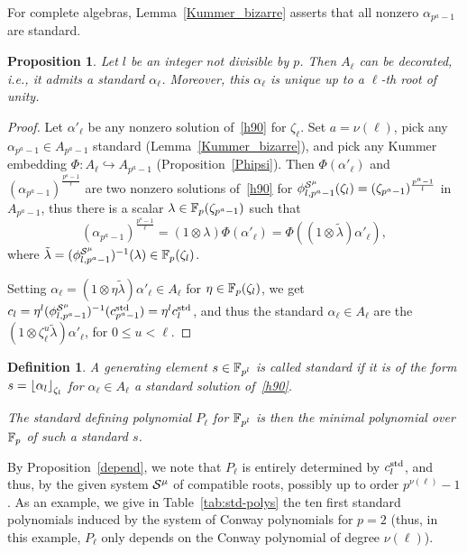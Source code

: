 \documentclass{sig-alternate}
\newtheorem{proposition}[theorem]{Proposition}
\newtheorem{definition}[theorem]{Definition}
\begin{document}
For complete algebras, Lemma~\ref{Kummer_bizarre} asserts that all nonzero $\alpha_{p^a-1}$ are standard.
\begin{proposition}
\label{standardexiste}
Let $l$ be an integer not divisible by $p$.
Then $A_\ell$ can be decorated, i.e., it admits a standard $\alpha_\ell$.
Moreover, this $\alpha_\ell$ is unique up to a $\ell$-th root of unity.
\end{proposition}
\begin{proof}
Let $\alpha'_\ell$ be any nonzero solution of~\eqref{h90} for $\zeta_\ell$.
Set $a=\nu(\ell)$, pick any $\alpha_{p^a-1}\in A_{p^a-1}$ standard (Lemma~\ref{Kummer_bizarre}),
and pick any Kummer embedding $\Phi:A_\ell\hookrightarrow A_{p^a-1}$ (Proposition~\ref{Phipsi}).
Then $\Phi(\alpha'_\ell)$ and $(\alpha_{p^a-1})^{\frac{p^a-1}{\ell}}$ are two nonzero solutions of~\eqref{h90}
for ${\phi^{\mathcal{S}^\mu}_{{l},{p^a-1}}}(\zeta_l)=(\zeta_{p^a-1})^{\frac{p^a-1}{l}}$ in $A_{p^a-1}$, thus there is a scalar $\lambda\in\mathbb{F}_{p}(\zeta_{p^a-1})$
such that
\begin{equation*}
(\alpha_{p^a-1})^{\frac{p^a-1}{\ell}}=(1\otimes\lambda)\Phi(\alpha'_\ell)=\Phi((1\otimes\tilde\lambda)\alpha'_\ell),
\end{equation*}
where $\tilde\lambda=({\phi^{\mathcal{S}^\mu}_{{l},{p^a-1}}})^{-1}(\lambda)\in\mathbb{F}_{p}(\zeta_{l})$.

Setting $\alpha_\ell=(1\otimes\eta\tilde\lambda)\alpha'_\ell\in A_\ell$ for $\eta\in\mathbb{F}_{p}(\zeta_l)$,
we get $c_{l}=\eta^l({\phi^{\mathcal{S}^\mu}_{{l},{p^a-1}}})^{-1}(c^{\mathrm{std}}_{p^a-1})=\eta^lc^{\mathrm{std}}_l$, and
thus the standard $\alpha_\ell\in A_\ell$ are the $(1\otimes\zeta_\ell^u\tilde\lambda)\alpha'_\ell$, for $0\leq u<\ell$.
\end{proof}

\begin{definition}
\label{sstandard}
A generating element $s\in\mathbb{F}_{p^l}$ is called \emph{standard}
if it is of the form $s=\left\lfloor \alpha_{l} \right\rfloor_{\zeta_l}$ for $\alpha_{\ell}\in A_\ell$
a standard solution of~\eqref{h90}.

The \emph{standard defining polynomial} $P_\ell$ for $\mathbb{F}_{p^l}$ is then the minimal polynomial over $\mathbb{F}_p$
of such a standard $s$.
\end{definition}

By Proposition~\ref{depend}, we note that $P_\ell$ is entirely determined by $c^{\mathrm{std}}_{l}$,
and thus, by the given system $\mathcal{S}^\mu$ of compatible roots, possibly up to order $p^{\nu(\ell)}-1$.
As an example, we give in Table~\ref{tab:std-polys} the ten first
standard polynomials induced by the system of Conway polynomials
for $p=2$ (thus, in this example, $P_\ell$ only depends on the Conway polynomial of degree $\nu(\ell)$).
\end{document}
